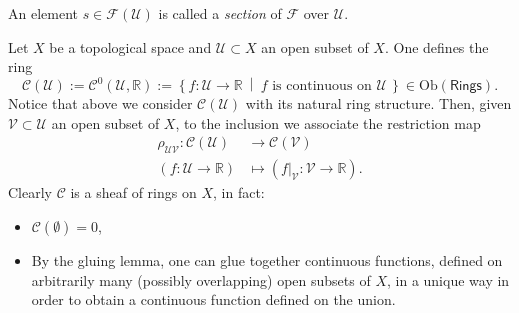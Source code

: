 \documentclass[../Main]{subfiles}
\begin{document}
\begin{defn}[Section]
	An element $s \in \mathcal{F}(\mathcal{U})$ is called a {\em section}
	of $\mathcal{F}$ over $\mathcal{U}$.
\end{defn}

\begin{ex}
	Let $X$ be a topological space and $\mathcal{U} \subset X$ an open subset of $X$.
	One defines the ring
	\begin{equation}
		\mathcal{C}(\mathcal{U}) := 
		\mathcal{C}^0\left( \mathcal{U}, \mathbb{R} \right) :=
		\left\{ f\colon \mathcal{U} \to \mathbb{R} \ \middle|\ 
		f \text{ is continuous on } \mathcal{U}\, \right\} \in 
		\mathrm{Ob} \left(\mathsf{Rings}\right) 
	.\end{equation} 
	Notice that above we consider $\mathcal{C}\left(\mathcal{U}\right)$
	with its natural ring structure.
	Then, given $\mathcal{V} \subset \mathcal{U}$ an open subset of $X$,
	to the inclusion we associate the restriction map
	\begin{align}
		\rho_{\mathcal{UV}}: \mathcal{C}(\mathcal{U}) &\longrightarrow \mathcal{C}(\mathcal{V}) \\
		\left( f\colon \mathcal{U} \to \mathbb{R} \right) &\longmapsto 
		\left( \left.f\right|_{\mathcal{V}}\colon \mathcal{V} \to \mathbb{R} \right) \nonumber
	.\end{align} 
	Clearly $\mathcal{C}$ is a sheaf of rings on $X$, in fact:
	\begin{itemize}
		\item $\mathcal{C}\left( \emptyset \right) = 0$,
		\item By the gluing lemma, one can glue together continuous functions,
			defined on arbitrarily many (possibly overlapping)
			open subsets of $X$, in a unique way
			in order to obtain a continuous function
			defined on the union.
	\end{itemize}
\end{ex}
\end{document}

